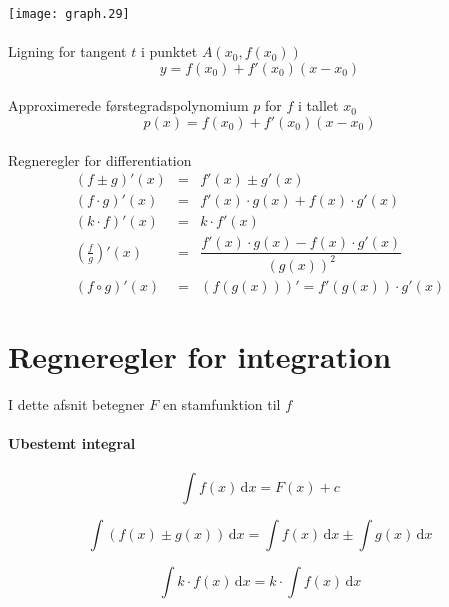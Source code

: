 \documentclass[11pt,a5paper,fleqn,leqno]{book}
\begin{document}
\texttt{[image: graph.29]}
\\
\\
Ligning for tangent $t$ i punktet $A(x_0,f(x_0))$
\begin{equation} \label{eq:diff_tangent_t}
y = f(x_0) + f'(x_0)(x-x_0)
\end{equation}
\\
Approximerede førstegradspolynomium $p$ for $f$ i tallet $x_0$
\begin{equation} \label{eq:diff_tangent_p}
p(x) = f(x_0) + f'(x_0)(x-x_0)
\end{equation}
\\
Regneregler for differentiation
\begin{eqnarray}
\left(f \pm g\right)'(x)     & = & f'(x) \pm g'(x) \\
\left(f \cdot g\right)'(x)   & = & f'(x) \cdot g(x) + f(x) \cdot g'(x) \\
\left(k \cdot f\right)'(x)   & = & k \cdot f'(x) \\
\left(\frac{f}{g}\right)'(x) & = & \dfrac{f'(x) \cdot g(x) - f(x) \cdot g'(x)}{\left(g(x)\right)^2} \\
\left(f \circ g\right)'(x)   & = & \left(f\left(g(x)\right)\right)' = f'\left(g(x)\right) \cdot g'(x)
\end{eqnarray}

\vfill

\section{Regneregler for integration}

I dette afsnit betegner $F$ en stamfunktion til $f$

\paragraph{Ubestemt integral}

\begin{equation}
\int f(x)\, \mathrm{d}x = F(x) + c
\end{equation}

\begin{equation}
\int \left(f(x) \pm g(x)\right)\, \mathrm{d}x = \int f(x)\, \mathrm{d}x \pm \int g(x)\, \mathrm{d}x
\end{equation}

\begin{equation}
\int k \cdot f(x)\, \mathrm{d}x = k \cdot \int f(x)\, \mathrm{d}x
\end{equation}
\end{document}
